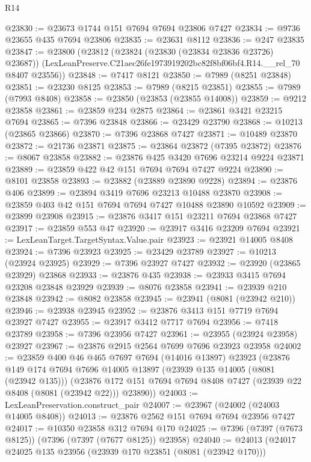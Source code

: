 \begin{lexlean}{R14}
\begin{coremodule}
@23830 := @23673 @1744 @151 @7694 @7694 @23806 @7427
@23834 := @9736 @23655 @435 @7694 @23806
@23835 := @23631 @8112
@23836 := @247 @23835
@23847 := @23800
    (@23812
      (@23824 (@23830 (@23834 @23836 @23726) @23687))
      (LexLeanPreserve.C21aec26fe1973919202bc82f8bf06bf4.R14.__rel_70 @8407 @23556))
@23848 := @7417 @8121
@23850 := @7989 (@8251 @23848)
@23851 := @23230 @8125
@23853 := @7989 (@8215 @23851)
@23855 := @7989 (@7993 @8408)
@23858 := @23850 (@23853 (@23855 @14008))
@23859 := @9212 @23858
@23861 := @23859 @234 @2875
@23864 := @23861 @3421 @23215 @7694
@23865 := @7396 @23848
@23866 := @23429 @23790
@23868 := @10213 (@23865 @23866)
@23870 := @7396 @23868 @7427
@23871 := @10489 @23870
@23872 := @21736 @23871
@23875 := @23864 @23872 (@7395 @23872)
@23876 := @8067 @23858
@23882 := @23876 @425 @3420 @7696 @23214 @9224 @23871
@23889 := @23859 @422 @42 @151 @7694 @7694 @7427 @9224
@23890 := @8101 @23858
@23893 := @23882 (@23889 @23890 @9228)
@23894 := @23876 @406
@23899 := @23894 @3419 @7696 @23213 @10488 @23870
@23908 := @23859 @403 @42 @151 @7694 @7694 @7427 @10488 @23890 @10592
@23909 := @23899 @23908
@23915 := @23876 @3417 @151 @23211 @7694 @23868 @7427
@23917 := @23859 @553 @47
@23920 := @23917 @3416 @23209 @7694
@23921 := LexLeanTarget.TargetSyntax.Value.pair
@23923 := @23921 @14005 @8408
@23924 := @7396 @23923
@23925 := @23429 @23789
@23927 := @10213 (@23924 @23925)
@23929 := @7396 @23927 @7427
@23932 := @23920 (@23865 @23929) @23868
@23933 := @23876 @435
@23938 := @23933 @3415 @7694 @23208 @23848 @23929
@23939 := @8076 @23858
@23941 := @23939 @210 @23848
@23942 := @8082 @23858
@23945 := @23941 (@8081 (@23942 @210))
@23946 := @23938 @23945
@23952 := @23876 @3413 @151 @7719 @7694 @23927 @7427
@23955 := @23917 @3412 @7717 @7694
@23956 := @7418 @23789
@23958 := @7396 @23956 @7427
@23961 := @23955 (@23924 @23958) @23927
@23967 := @23876 @2915 @2564 @7699 @7696 @23923 @23958
@24002 := @23859
    @400
    @46
    @465
    @7697
    @7694
    (@14016 @13897)
    @23923
    (@23876
      @149
      @174
      @7694
      @7696
      @14005
      @13897
      (@23939 @135 @14005 (@8081 (@23942 @135)))
      (@23876 @172 @151 @7694 @7694 @8408 @7427 (@23939 @22 @8408 (@8081 (@23942 @22))) @23890))
@24003 := LexLeanPreservation.construct_pair
@24007 := @23967 (@24002 (@24003 @14005 @8408))
@24013 := @23876 @2562 @151 @7694 @7694 @23956 @7427
@24017 := @10350 @23858 @312 @7694 @170
@24025 := @7396 (@7397 (@7673 @8125)) (@7396 (@7397 (@7677 @8125)) @23958)
@24040 := @24013
    (@24017
      @24025
      @135
      @23956
      (@23939 @170 @23851 (@8081 (@23942 @170)))

\end{coremodule}
\end{lexlean}
